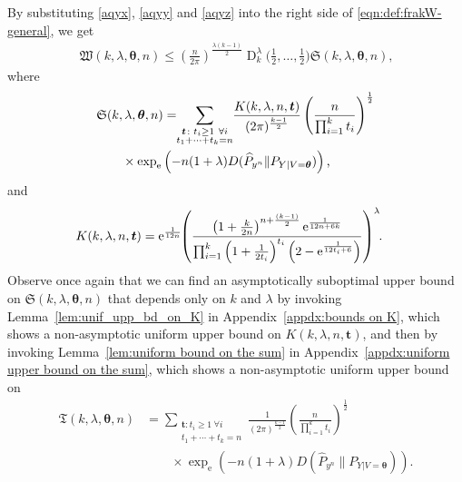 \documentclass[journal, 10pt]{IEEEtran}
\newcommand{\rme}{\mathrm{e}}
\newcommand{\mfrakS}{\mathfrak{S}}
\newcommand{\mfrakT}{\mathfrak{T}}
\newcommand{\mfrakW}{\mathfrak{W}}
\theoremstyle{plain}
\theoremstyle{plain}
\theoremstyle{plain}
\theoremstyle{plain}
\newcommand{\boldtheta}{\mathbold{\theta}}
\newcommand{\boldt}{\mathbold{t}}
\newcommand{\opD}{\operatorname{D}}
\begin{document}
\begin{IEEEproof}
By substituting \eqref{aqyx}, \eqref{aqyy} and \eqref{aqyz} into the right side of \eqref{eqn:def:frakW-general}, we get
\begin{align}
\mfrakW(k, \lambda, \boldtheta, n) 
\le 
\left( \frac{n}{2\pi} \right)^{\frac{\lambda (k-1)}{2}} \opD_k^\lambda\Big(\tfrac12, \hdots, \tfrac12\Big) \mfrakS(k,\lambda, \boldtheta, n)\text{,} \label{eqn:thanks_to_substitition}
\end{align}
where
\begin{align}
&\mfrakS(k,\lambda, \boldtheta, n)=\hspace{-1mm} \sum_{\substack{\boldt \colon t_i \ge 1 \ \forall i \\ t_1+\cdots+ t_k=n }}  \hspace{-0.7mm} \frac{K(k,\lambda, n, \boldt)}{(2\pi)^{\frac{k-1}{2}} } \left(\frac{n}{\prod_{i=1}^{k}t_i}\right)^{\frac12} \label{eqn:def:frakS-general}\\ & \qquad
\times \exp_\rme\left(-n(1+\lambda)D(\widehat{P}_{y^n}\| P_{Y|V=\boldtheta})\right)\text{,} \nonumber
\end{align}
and
\begin{align}
K(k,\lambda, n, \boldt )&=\rme^{\frac{1}{12n}} \hspace{-1mm} \left(\frac{\left( 1+\frac{k}{2n} \right)^{n+\frac{(k-1)}{2}}\rme^\frac{1}{12n+6k}}{\prod_{i=1}^{k}\left( 1+\frac{1}{2t_i} \right)^{ t_i }\left(2-\rme^{\frac{1}{12t_i+6}}\right)}  \right)^\lambda \hspace{-1mm} \text{.} \label{eqn:def:K-general}
\end{align}
Observe once again that we can find an asymptotically suboptimal upper bound on $\mfrakS (k, \lambda, \boldtheta, n)$ that depends only on $k$ and $\lambda $ by invoking Lemma~\ref{lem:unif_upp_bd_on_K} in Appendix~\ref{appdx:bounds on K}, which shows a non-asymptotic uniform upper bound on $K(k, \lambda, n, \boldt)$, and then by invoking Lemma~\ref{lem:uniform bound on the sum} in Appendix~\ref{appdx:uniform upper bound on the sum}, which shows a non-asymptotic uniform upper bound on
\begin{align}
\mfrakT(k, \lambda, \boldtheta, n)&= \sum_{\substack{\boldt \colon t_i \ge 1 \ \forall i \\ t_1+\cdots+ t_k=n }}  \frac{1}{(2\pi)^{\frac{k-1}{2}}} \left(\frac{n}{\prod_{i=1}^{k}t_i}\right)^\frac12 \label{eqn:def:mfrakT-general}\\ 
&\qquad
\times \exp_\rme\left(-n(1+\lambda)D(\widehat{P}_{y^n}\| P_{Y|V=\boldtheta})\right)\text{.} \nonumber
\end{align}

\end{IEEEproof}
\end{document}
